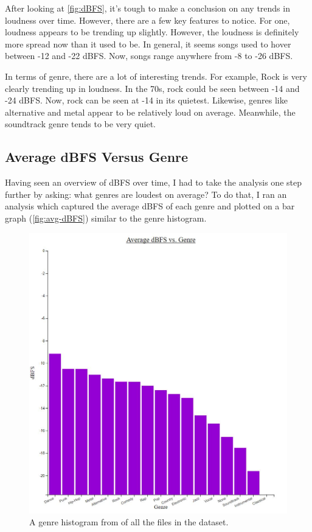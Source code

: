 \documentclass[journal]{vgtc}                %
\begin{document}
After looking at \autoref{fig:dBFS}, it's tough to make a conclusion on any
trends in loudness over time. However, there are a few key features to notice.
For one, loudness appears to be trending up slightly. However, the loudness
is definitely more spread now than it used to be. In general, it seems songs
used to hover between -12 and -22 dBFS. Now, songs range anywhere from -8 to -26
dBFS.

In terms of genre, there are a lot of interesting trends. For example, Rock
is very clearly trending up in loudness. In the 70s, rock could be seen between
-14 and -24 dBFS. Now, rock can be seen at -14 in its quietest. Likewise,
genres like alternative and metal appear to be relatively loud on average.
Meanwhile, the soundtrack genre tends to be very quiet.

\subsection{Average dBFS Versus Genre}

Having seen an overview of dBFS over time, I had to take the analysis one step
further by asking: what genres are loudest on average? To do that, I ran an
analysis which captured the average dBFS of each genre and plotted on a bar
graph (\autoref{fig:avg-dBFS}) similar to the genre histogram.

\begin{figure}[h]
 \centering %
 \includegraphics[width=\columnwidth]{average-dbfs-vs-genre}
 \caption{A genre histogram from \cite{Grifski:2019} of all the files in the dataset.}
 \label{fig:avg-dBFS}
\end{figure}
\end{document}
